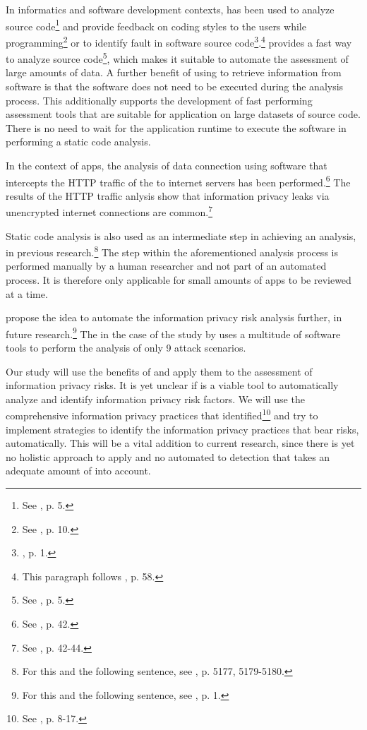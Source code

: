 In informatics and software development contexts, \sca has been used to analyze source code\footnote{See \cite{Haris2014}, p.  5.} and provide feedback on coding styles to the users while programming\footnote{See \cite{Bardas2010}, p. 10.} or to identify fault in software source code\footnote{\cite{Bardas2010}, p. 1.}.\footnote{This paragraph follows \cite{Louridas2006}, p. 58.}
\Sca provides a fast way to analyze source code\footnote{See \cite{Bardas2010}, p. 5.}, which makes it suitable to automate the assessment of large amounts of data.
A further benefit of using \sca to retrieve information from software is that the software does not need to be executed during the analysis process.
This additionally supports the development of fast performing assessment tools that are suitable for application on large datasets of source code.
There is no need to wait for the application runtime to execute the software in performing a static code analysis.

In the context of \mH apps, the analysis of data connection using software that intercepts the HTTP traffic of the \mH to internet servers has been performed.\footnote{See \cite{Mense2015}, p. 42.}
The results of the HTTP traffic anlysis show that information privacy leaks via unencrypted internet connections are common.\footnote{See \cite{Mense2015}, p. 42-44.}

Static code analysis is also used as an intermediate step in achieving an \ipr analysis, in previous research.\footnote{For this and the following sentence, see \cite{Dorazio2015}, p. 5177, 5179-5180.}
The \sca step within the aforementioned analysis process is performed manually by a human researcher and not part of an automated process.
It is therefore only applicable for small amounts of apps to be reviewed at a time.

\textcite{Knorr2015} propose the idea to automate the information privacy risk analysis further, in future research.\footnote{For this and the following sentence, see \cite{Knorr2015}, p. 1.}
The \sca in the case of the study by \textcite{Knorr2015} uses a multitude of software tools to perform the analysis of only 9 attack scenarios.

Our study will use the benefits of \sca and apply them to the assessment of \mH information privacy risks.
It is yet unclear if \sca is a viable tool to automatically analyze and identify information privacy risk factors.
We will use the comprehensive information privacy practices that \cite{Dehling2016} identified\footnote{See \cite{Dehling2016}, p. 8-17.} and try to implement \sca strategies to identify the information privacy practices that bear risks, automatically.
This will be a vital addition to current research, since there is yet no holistic approach to apply and no automated \sca to \ipr detection that takes an adequate amount of \iprfs into account.


